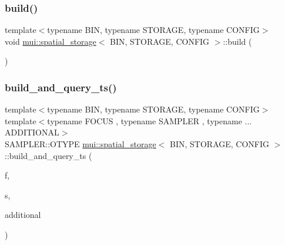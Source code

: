 \subsubsection{\texorpdfstring{build()}{build()}}
{\footnotesize\ttfamily template$<$typename B\+IN, typename S\+T\+O\+R\+A\+GE, typename C\+O\+N\+F\+IG$>$ \\
void \hyperlink{classmui_1_1spatial__storage}{mui\+::spatial\+\_\+storage}$<$ B\+IN, S\+T\+O\+R\+A\+GE, C\+O\+N\+F\+IG $>$\+::build (\begin{DoxyParamCaption}{ }\end{DoxyParamCaption})\hspace{0.3cm}{\ttfamily [inline]}}

\mbox{\label{classmui_1_1spatial__storage_a74508b30f32188bf5252d1c5eb99933d}} 
\subsubsection{\texorpdfstring{build\+\_\+and\+\_\+query\+\_\+ts()}{build\_and\_query\_ts()}}
{\footnotesize\ttfamily template$<$typename B\+IN, typename S\+T\+O\+R\+A\+GE, typename C\+O\+N\+F\+IG$>$ \\
template$<$typename F\+O\+C\+US , typename S\+A\+M\+P\+L\+ER , typename ... A\+D\+D\+I\+T\+I\+O\+N\+AL$>$ \\
S\+A\+M\+P\+L\+E\+R\+::\+O\+T\+Y\+PE \hyperlink{classmui_1_1spatial__storage}{mui\+::spatial\+\_\+storage}$<$ B\+IN, S\+T\+O\+R\+A\+GE, C\+O\+N\+F\+IG $>$\+::build\+\_\+and\+\_\+query\+\_\+ts (\begin{DoxyParamCaption}\item[{const F\+O\+C\+US \&}]{f,  }\item[{const S\+A\+M\+P\+L\+ER \&}]{s,  }\item[{A\+D\+D\+I\+T\+I\+O\+N\+AL \&\&...}]{additional }\end{DoxyParamCaption})\hspace{0.3cm}{\ttfamily [inline]}}

\mbox{\label{classmui_1_1spatial__storage_ab45a2e3749d60948fb0bf5854c79db81}} 
